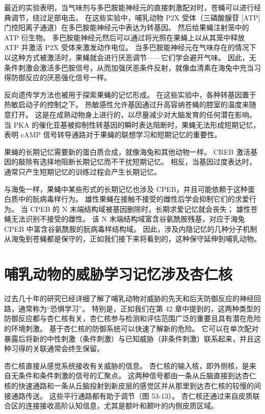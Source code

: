 最近的实验表明，当气味剂与多巴胺能神经元的直接刺激配对时，苍蝇可以进行经典调节，绕过足部电击。 在这些实验中，哺乳动物 P2X 受体（三磷酸腺苷 [ATP] 门控阳离子通道）在多巴胺能神经元中表达为转基因。 然后给果蝇注射笼中的 ATP 衍生物。 多巴胺能神经元然后可以通过将光照在果蝇上以从其笼中释放 ATP 并激活 P2X 受体来激发动作电位。 当多巴胺能神经元在气味存在的情况下以这种方式被激活时，果蝇就会进行厌恶调节——它们学会避开气味。 因此，无条件刺激会激活多巴胺信号，从而加强厌恶条件反射，就像血清素在海兔中充当习得防御反应的厌恶强化信号一样。

反向遗传学方法也被用于探索果蝇的记忆形成。 在这些实验中，各种转基因置于热敏启动子的控制之下。 热敏感性允许基因通过升高容纳苍蝇的腔室的温度来随意打开。 这是在成熟动物身上进行的，以尽量减少对大脑发育的任何潜在影响。 当 PKA 的催化亚基被抑制性转基因的瞬时表达阻断时，果蝇无法形成短期记忆，表明 cAMP 信号转导通路对于果蝇的联想学习和短期记忆的重要性。

果蝇的长期记忆需要新的蛋白质合成，就像海兔和其他动物一样。 CREB 激活基因的敲除有选择地阻断长期记忆而不干扰短期记忆。 相反，当基因过度表达时，通常只产生短期记忆的训练过程会产生长期记忆。

与海兔一样，果蝇中某些形式的长期记忆也涉及 CPEB，并且可能依赖于这种蛋白质中的朊病毒样行为。 雄性果蝇在接触不接受的雌性后学会抑制它们的求爱行为。 当 CPEB 的 N 末端结构域被基因删除时，长期求爱记忆就会丧失； 雄性苍蝇无法识别不接受的雌性。 该 N 末端结构域富含谷氨酰胺残基，对应于海兔 CPEB 中富含谷氨酰胺的朊病毒样结构域。 因此，涉及内隐记忆的几种分子机制从海兔到苍蝇都是保守的，正如我们接下来将看到的，这种保守延伸到哺乳动物。


\section{哺乳动物的威胁学习记忆涉及杏仁核}
过去几十年的研究已经详细了解了哺乳动物对威胁的先天和后天防御反应的神经回路，通常称为“恐惧学习”。 特别是，正如我们在第 42 章中提到的，这两种类型的防御反应都与杏仁核有关，杏仁核参与检测和评估范围广泛的重要且具有潜在危险的环境刺激。 基于杏仁核的防御系统可以快速了解新的危险。 它可以在单次配对暴露后将新的中性刺激（条件刺激）与已知威胁（非条件刺激）联系起来，并且这种习得的关联通常会终生保留。

杏仁核直接从感觉系统接收有关威胁的信息。 杏仁核的输入核，即外侧核，是来自无条件和条件刺激的信号的汇聚点。 这两种信号都由一条从丘脑直接到达杏仁核的快速通路和一条从丘脑投射到新皮层的感觉区并从那里到达杏仁核的较慢的间接通路传送。 这些平行通路都有助于调节（图 53-13）。 杏仁核还通过来自皮质联合区的连接接收高阶认知信息，尤其是额叶和颞叶的内侧皮质区域。

